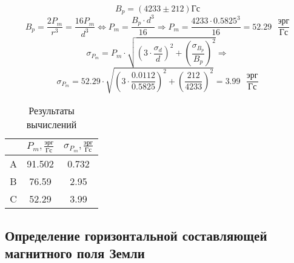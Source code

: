 \documentclass[a4paper,12pt]{article} %
\begin{document}
\[ B_p = (4233 \pm 212) \text{Гс} \]
\[ B_p = \frac{2P_m}{r^3} = \frac{16P_m}{d^3} \Longleftrightarrow P_m = \frac{B_p\cdot d^3}{16} \Longrightarrow P_m = \frac{4233\cdot0.5825^3}{16} = 52.29 \text{ }\frac{\text{эрг}}{\text{Гс}}  \]
\[ \sigma_{P_m} = P_m\cdot\sqrt{\left(3\cdot\frac{\sigma_{d}}{d}\right)^2 + \left(\frac{\sigma_{B_p}}{B_p}\right)^2} \Longrightarrow \] 
\[ \sigma_{P_m} = 52.29\cdot\sqrt{\left(3\cdot\frac{0.0112}{0.5825}\right)^2 + \left(\frac{212}{4233}\right)^2} = 3.99 \text{ }\frac{\text{эрг}}{\text{Гс}} \]

\begin{table}[h]
\centering
    \begin{tabular}{|c|c|c|}
        \hline
        \text{ } & $P_m, \frac{\text{эрг}}{\text{Гс}}$ & $\sigma_{P_m}, \frac{\text{эрг}}{\text{Гс}}$ \\ \hline
          A & 91.502 & 0.732 \\ \hline
          B & 76.59 & 2.95 \\ \hline
          C & 52.29 & 3.99 \\ \hline
    \end{tabular}
    \label{tab2}
    \caption{Результаты вычислений}
\end{table}

\newpage

\subsection{Определение горизонтальной составляющей магнитного поля Земли}
\end{document}

